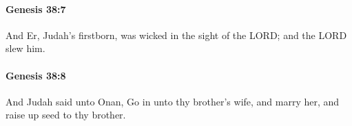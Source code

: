 		\paragraph{Genesis 38:7} %
			\label{GENESIS-38-7}

			And Er, Judah's firstborn, was wicked in the sight of the LORD; and the LORD slew him.


		\paragraph{Genesis 38:8} %
			\label{GENESIS-38-8}

			And Judah said unto Onan, Go in unto thy brother's wife, and marry her, and raise up seed to thy brother.


